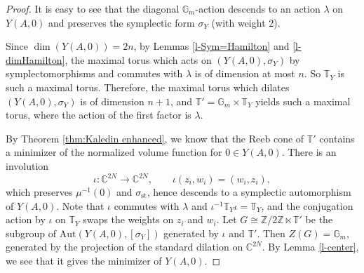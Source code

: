 \documentclass[12pt]{amsart}
\theoremstyle{definition}
\newcommand{\bZ}{\mathbb{Z}}
\newcommand{\bT}{\mathbb{T}}
\newcommand{\bG}{\mathbb{G}}
\newcommand{\Aut}{\mathrm{Aut}}
\numberwithin{equation}{section}
\begin{document}
\begin{proof}
It is easy to see that the diagonal $\mathbb{G}_m$-action descends to an action $\lambda$ on $Y(A,0)$ and preserves the symplectic form \(\sigma_Y\) (with weight \(2\)). 

Since $\dim (Y(A,0))=2n$, by Lemmas \ref{l-Sym=Hamilton} and \ref{l-dimHamilton}, the maximal torus which acts on $(Y(A,0),\sigma_Y)$ by symplectomorphisms and commutes with $\lambda$ is of dimension at most $n$. So $\mathbb{T}_Y$ is such a maximal torus. Therefore, the maximal torus which dilates $(Y(A,0),\sigma_Y)$ is of dimension $n+1$, and $\mathbb{T}'=\mathbb{G}_m\times \mathbb T_Y$ yields such a maximal torus, where the action of the first factor is $\lambda$. 


By Theorem \ref{thm:Kaledin enhanced}, we know that the Reeb cone of $\mathbb{T}'$ contains a minimizer of the normalized volume function for $0\in Y(A,0)$. 
There is an involution
\[
        \iota:\mathbb C^{2N}\longrightarrow \mathbb C^{2N},
        \qquad
        \iota(z_i,w_i)=(w_i,z_i),
\]
which preserves $\mu^{-1}(0)$ and $\sigma_{\mathrm{st}}$, hence descends to a symplectic automorphism of $Y(A,0)$. Note that $\iota$ commutes with $\lambda$ and  $\iota^{-1}\bT_Y\iota=\bT_Y$, and the conjugation action by $\iota$ on $\bT_Y$ swaps the weights on $z_i$ and $w_i$. Let $G\cong \bZ/2\bZ\ltimes \bT'$ be the subgroup of $\Aut(Y(A,0),[\sigma_Y])$ generated by $\iota$ and $\bT'$. Then $Z(G)=\bG_m$, generated by the projection of the standard dilation on $\mathbb{C}^{2N}$. By Lemma \ref{l-center}, we see that it gives the minimizer of $Y(A,0)$. %
\end{proof}
\end{document}

